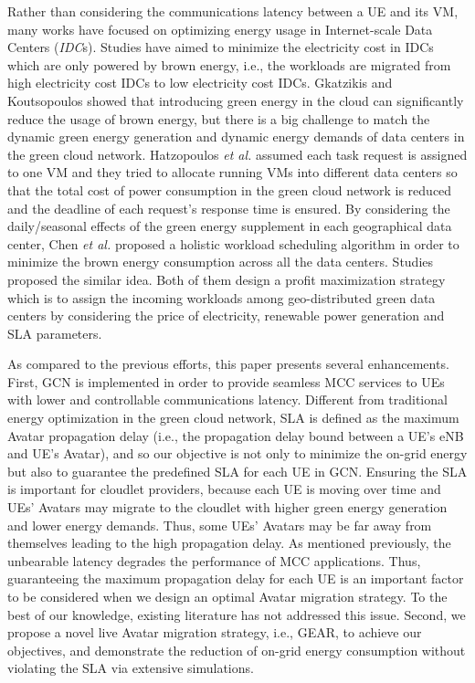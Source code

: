 \documentclass[journal,12pt,draftclsnofoot,onecolumn]{IEEEtran}
\begin{document}
Rather than considering the communications latency between a UE and its VM, many works have focused on optimizing energy usage in Internet-scale Data Centers (\emph{IDC}s). Studies \cite{8}\cite{9}\cite{10}\cite{11}\cite{12} have aimed to minimize the electricity cost in IDCs which are only powered by brown energy, i.e., the workloads are migrated from high electricity cost IDCs to low electricity cost IDCs. Gkatzikis and Koutsopoulos \cite{13} showed that introducing green energy in the cloud can significantly reduce the usage of brown energy, but there is a big challenge to match the dynamic green energy generation and dynamic energy demands of data centers in the green cloud network. Hatzopoulos \emph{et al.} \cite{14} assumed each task request is assigned to one VM and they tried to allocate running VMs into different data centers so that the total cost of power consumption in the green cloud network is reduced and the deadline of each request's response time is ensured. By considering the daily/seasonal effects of the green energy supplement in each geographical data center, Chen \emph{et al.} \cite{15} proposed a holistic workload scheduling algorithm in order to minimize the brown energy consumption across all the data centers. Studies \cite{16}\cite{17} proposed the similar idea. Both of them design a profit maximization strategy which is to assign the incoming workloads among geo-distributed green data centers by considering the price of electricity, renewable power generation and SLA parameters.\

As compared to the previous efforts, this paper presents several enhancements. First, GCN is implemented in order to provide seamless MCC services to UEs with lower and controllable communications latency. Different from traditional energy optimization in the green cloud network, SLA is defined as the maximum Avatar propagation delay (i.e., the propagation delay bound between a UE's eNB and UE's Avatar), and so our objective is not only to minimize the on-grid energy but also to guarantee the predefined SLA for each UE in GCN. Ensuring the SLA is important for cloudlet providers, because each UE is moving over time and UEs' Avatars may migrate to the cloudlet with higher green energy generation and lower energy demands. Thus, some UEs' Avatars may be far away from themselves leading to the high propagation delay. As mentioned previously, the unbearable latency degrades the performance of MCC applications. Thus, guaranteeing the maximum propagation delay for each UE is an important factor to be considered when we design an optimal Avatar migration strategy. To the best of our knowledge, existing literature has not addressed this issue. Second, we propose a novel live Avatar migration strategy, i.e., GEAR, to achieve our objectives, and demonstrate the reduction of on-grid energy consumption without violating the SLA via extensive simulations.
\end{document}
